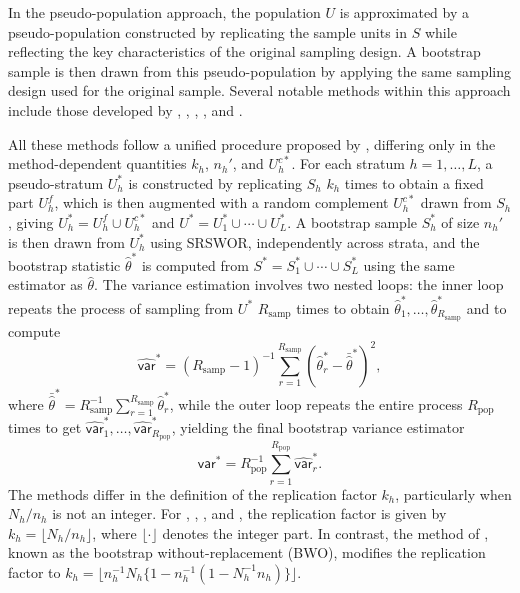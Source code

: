 \noindent In the pseudo-population approach, the population \(U\) is approximated by a pseudo-population constructed by replicating the sample units in \(\textrm{$S$}\) while reflecting the key characteristics of the original sampling design. A bootstrap sample is then drawn from this pseudo-population by applying the same sampling design used for the original sample. Several notable methods within this approach include those developed by \citet{Bickel:Freedman:1984}, \citet{Chao:Lo:1985}, \citet{Sitter:1992a}, \citet{Booth:Butler:Hall:1994}, and \citet{Chao:Lo:1994}.

All these methods follow a unified procedure proposed by \citet{Mashreghi:Haziza:Leger:2016}, differing only in the method-dependent quantities \(k_h\), \(n_h'\), and \(U_h^{c*}\). For each stratum \(h = 1, \ldots, L\), a pseudo-stratum \(U_h^*\) is constructed by replicating \(\textrm{$S$}_h\) \(k_h\) times to obtain a fixed part \(U_h^f\), which is then augmented with a random complement \(U_h^{c*}\) drawn from \(\textrm{$S$}_h\), giving \(U_h^* = U_h^f \cup U_h^{c*}\) and \(U^* = U_1^* \cup \cdots \cup U_L^*\). A bootstrap sample \(\textrm{$S$}_h^*\) of size \(n_h'\) is then drawn from \(U_h^*\) using SRSWOR, independently across strata, and the bootstrap statistic \(\hat{\theta}^*\) is computed from \(\textrm{$S$}^* = \textrm{$S$}_1^* \cup \cdots \cup \textrm{$S$}_L^*\) using the same estimator as \(\hat{\theta}\). The variance estimation involves two nested loops: the inner loop repeats the process of sampling from \(U^*\) \(R_{\text{samp}}\) times to obtain \(\hat{\theta}^*_1, \ldots, \hat{\theta}^*_{R_{\text{samp}}}\) and to compute
\[
    \hat{\mathsf{var}}^* = (R_{\text{samp}} - 1)^{-1} \sum_{r=1}^{R_{\text{samp}}}
(\hat{\theta}_r^* - \bar{\hat{\theta}}^*)^2,
\]
where \(\bar{\hat{\theta}}^* = R_{\text{samp}}^{-1} \sum_{r=1}^{R_{\text{samp}}} \hat{\theta}_r^*\), while the outer loop repeats the entire process \(R_{\text{pop}}\) times to get \(\hat{\mathsf{var}}_1^*, \ldots, \hat{\mathsf{var}}_{R_{\text{pop}}}^*\), yielding the final bootstrap variance estimator
\begin{equation}
    \mathsf{var}^* = R_{\text{pop}}^{-1} \sum_{r=1}^{R_{\text{pop}}} \hat{\mathsf{var}}_r^*.
    \label{eq:MCVarTwoloops}
\end{equation}
The methods differ in the definition of the replication factor \(k_h\), particularly when \(N_h/n_h\) is not an integer. For \citet{Booth:Butler:Hall:1994}, \citet{Chao:Lo:1994}, \citet{Bickel:Freedman:1984}, and \citet{Chao:Lo:1985}, the replication factor is given by \(k_h = \lfloor N_h/n_h \rfloor\), where \(\lfloor \cdot \rfloor\) denotes the integer part. In contrast, the method of \citet{Sitter:1992a}, known as the bootstrap without-replacement (BWO), modifies the replication factor to \(k_h = \lfloor n_h^{-1}N_h\{1 - n_h^{-1}({1 - N_h^{-1}n_h})\}\rfloor\).

